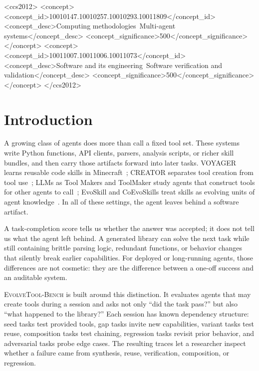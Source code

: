 \documentclass[sigconf,anonymous,natbib=false]{acmart}
\begin{document}
\begin{CCSXML}
<ccs2012>
 <concept>
  <concept_id>10010147.10010257.10010293.10011809</concept_id>
  <concept_desc>Computing methodologies~Multi-agent systems</concept_desc>
  <concept_significance>500</concept_significance>
 </concept>
 <concept>
  <concept_id>10011007.10011006.10011073</concept_id>
  <concept_desc>Software and its engineering~Software verification and validation</concept_desc>
  <concept_significance>500</concept_significance>
 </concept>
</ccs2012>
\end{CCSXML}

\maketitle

\section{Introduction}

A growing class of agents does more than call a fixed tool set. These systems write Python functions, API clients, parsers, analysis scripts, or richer skill bundles, and then carry those artifacts forward into later tasks. VOYAGER learns reusable code skills in Minecraft~\cite{wang2023voyager}; CREATOR separates tool creation from tool use~\cite{qian2023creator}; LLMs as Tool Makers and ToolMaker study agents that construct tools for other agents to call~\cite{cai2023latm,wolflein2025toolmaker}; EvoSkill and CoEvoSkills treat skills as evolving units of agent knowledge~\cite{alzubi2026evoskill,zhang2026coevoskills}. In all of these settings, the agent leaves behind a software artifact.

A task-completion score tells us whether the answer was accepted; it does not tell us what the agent left behind. A generated library can solve the next task while still containing brittle parsing logic, redundant functions, or behavior changes that silently break earlier capabilities. For deployed or long-running agents, those differences are not cosmetic: they are the difference between a one-off success and an auditable system.

\textsc{EvolveTool-Bench} is built around this distinction. It evaluates agents that may create tools during a session and asks not only ``did the task pass?'' but also ``what happened to the library?'' Each session has known dependency structure: seed tasks test provided tools, gap tasks invite new capabilities, variant tasks test reuse, composition tasks test chaining, regression tasks revisit prior behavior, and adversarial tasks probe edge cases. The resulting traces let a researcher inspect whether a failure came from synthesis, reuse, verification, composition, or regression.
\end{document}
